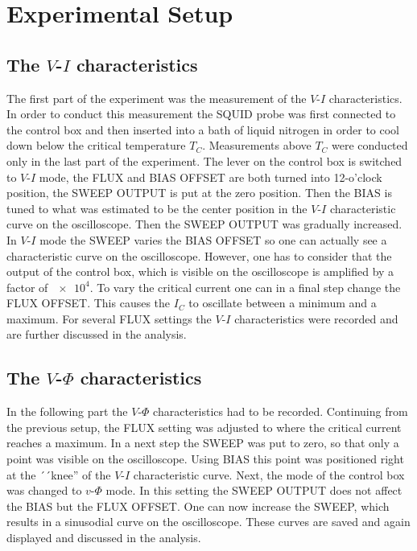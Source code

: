 \documentclass[a4paper,10pt]{article}
\begin{document}
\section{Experimental Setup}

\subsection{The $V$-$I$ characteristics}
\label{setup_vi}
The first part of the experiment was the measurement of the $V$-$I$ characteristics. In order to conduct this measurement the SQUID probe was first connected to the control box and then inserted into a bath of liquid nitrogen in order to cool down below the critical temperature $T_C$. Measurements above $T_C$ were conducted only in the last part of the experiment. 
The lever on the control box is switched to $V$-$I$ mode, the FLUX and BIAS OFFSET are both turned into 12-o'clock position, the SWEEP OUTPUT is put at the zero position. Then the BIAS is tuned to what was estimated to be the center position in the $V$-$I$ characteristic curve on the oscilloscope. Then the SWEEP OUTPUT was gradually increased. In $V$-$I$ mode the SWEEP varies the BIAS OFFSET so one can actually see a characteristic curve on the oscilloscope. However, one has to consider that the output of the control box, which is visible on the oscilloscope is amplified by a factor of $\num{e4}$.\cite{skriptum} 
To vary the critical current one can in a final step change the FLUX OFFSET. This causes the $I_C$ to oscillate between a minimum and a maximum. For several FLUX settings the $V$-$I$ characteristics were recorded and are further discussed in the analysis.

\subsection{The $V$-$\Phi$ characteristics}
In the following part the $V$-$\Phi$ characteristics had to be recorded. Continuing from the previous setup, the FLUX setting was adjusted to where the critical current reaches a maximum. In a next step the SWEEP was put to zero, so that only a point was visible on the oscilloscope. Using BIAS this point was positioned right at the ´´knee'' of the $V$-$I$ characteristic curve. 
Next, the mode of the control box was changed to $v$-$\Phi$ mode. In this setting the SWEEP OUTPUT does not affect the BIAS but the FLUX OFFSET. One can now increase the SWEEP, which results in a sinusodial curve on the oscilloscope. These curves are saved and again displayed and discussed in the analysis.  
\end{document}
